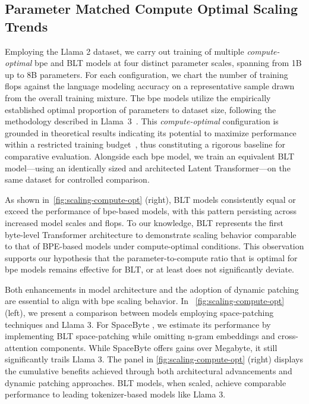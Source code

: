 \subsection{Parameter Matched Compute Optimal Scaling Trends}
\label{section:parameter-matched-scaling}
Employing the Llama 2 dataset, we carry out training of multiple \textit{compute-optimal} bpe and {\textsc BLT} models at four distinct parameter scales, spanning from 1B up to 8B parameters. For each configuration, we chart the number of training flops against the language modeling accuracy on a representative sample drawn from the overall training mixture. The bpe models utilize the empirically established optimal proportion of parameters to dataset size, following the methodology described in Llama~3~\citep{dubey2024llama}. This \textit{compute-optimal} configuration is grounded in theoretical results indicating its potential to maximize performance within a restricted training budget~\citep{hoffmann2022training}, thus constituting a rigorous baseline for comparative evaluation. Alongside each bpe model, we train an equivalent {\textsc BLT} model—using an identically sized and architected Latent Transformer—on the same dataset for controlled comparison.

As shown in~\autoref{fig:scaling-compute-opt} (right), {\textsc BLT} models consistently equal or exceed the performance of bpe-based models, with this pattern persisting across increased model scales and flops. To our knowledge, {\textsc BLT} represents the first byte-level Transformer architecture to demonstrate scaling behavior comparable to that of BPE-based models under compute-optimal conditions. This observation supports our hypothesis that the parameter-to-compute ratio that is optimal for bpe models remains effective for {\textsc BLT}, or at least does not significantly deviate.

Both enhancements in model architecture and the adoption of dynamic patching are essential to align with bpe scaling behavior. In ~\autoref{fig:scaling-compute-opt} (left), we present a comparison between models employing space-patching techniques and Llama 3. For SpaceByte \citep{slagle2024spacebyte}, we estimate its performance by implementing {\textsc BLT} space-patching while omitting n-gram embeddings and cross-attention components. While SpaceByte offers gains over Megabyte, it still significantly trails Llama 3. The panel in \autoref{fig:scaling-compute-opt} (right) displays the cumulative benefits achieved through both architectural advancements and dynamic patching approaches. {\textsc BLT} models, when scaled, achieve comparable performance to leading tokenizer-based models like Llama 3.

